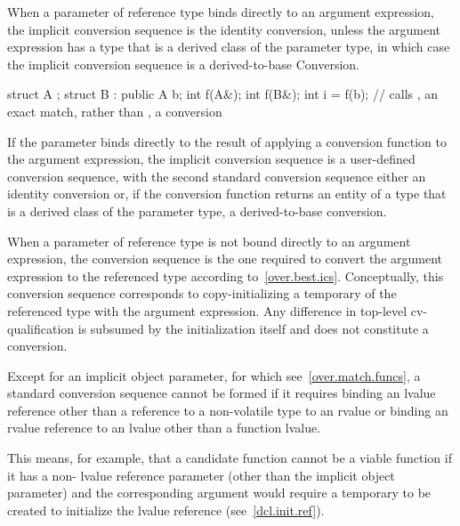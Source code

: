 \pnum
When a parameter of reference type binds directly to an
argument expression, the implicit conversion sequence is the identity conversion,
unless the argument expression has a type that is a derived class of the parameter
type, in which case the implicit conversion sequence is a derived-to-base
Conversion.
\begin{example}

\begin{codeblock}
struct A {};
struct B : public A {} b;
int f(A&);
int f(B&);
int i = f(b);       // calls , an exact match, rather than , a conversion
\end{codeblock}
\end{example}
If the parameter binds directly to the result of
applying a conversion function to the argument expression, the implicit
conversion sequence is a user-defined conversion sequence,
with the second standard conversion sequence either an identity conversion or,
if the conversion function returns an entity of a type that is a derived class
of the parameter type, a derived-to-base conversion.

\pnum
When a parameter of reference type is not bound directly to an argument
expression, the conversion sequence is the one required to convert the argument
expression to the referenced type according to~\ref{over.best.ics}.
Conceptually, this conversion sequence corresponds to copy-initializing a
temporary of the referenced type with the argument expression.
Any difference
in top-level cv-qualification is subsumed by the initialization itself and
does not constitute a conversion.

\pnum
Except for an implicit object parameter, for which see~\ref{over.match.funcs}, a
standard conversion sequence cannot be formed if it requires
binding an lvalue reference
other than a reference to a non-volatile  type
to an rvalue
or binding an rvalue reference to an lvalue other than a function lvalue.
\begin{note}
This means, for example, that a candidate function cannot be a viable
function if it has a non- lvalue reference parameter (other than
the implicit object parameter) and the corresponding argument
would require a temporary to be created to initialize the lvalue
reference (see~\ref{dcl.init.ref}).
\end{note}

